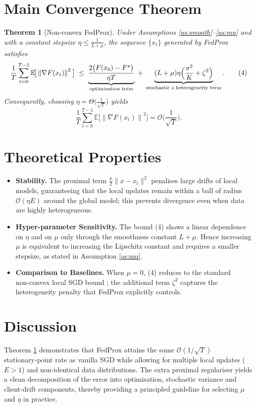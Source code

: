 \documentclass{article}
\newtheorem{theorem}{Theorem}
\newcommand{\EE}{\mathbb{E}}
\newcommand{\norm}[1]{\left\|#1\right\|}
\begin{document}
\section*{Main Convergence Theorem}
\begin{theorem}[Non‑convex FedProx]\label{thm:main}
Under Assumptions \ref{as:smooth}–\ref{as:mu} and with a constant stepsize
$\eta\le \frac{1}{L+\mu}$, the sequence $\{x_t\}$ generated by FedProx satisfies
\[
\frac1T\sum_{t=0}^{T-1}\EE\!\big[\norm{\nabla F(x_t)}^{2}\big]
\;\le\;
\underbrace{\frac{2\big(F(x_0)-F^{\star}\big)}{\eta T}}_{\text{optimization term}}
\;+\;
\underbrace{(L+\mu)\eta\Big(\frac{\sigma^{2}}{K}+ \zeta^{2}\Big)}_{\text{stochastic\,+\,heterogeneity term}}.
\tag{4}
\]
Consequently, choosing $\eta=\Theta\!\big(\frac{1}{\sqrt{T}}\big)$ yields
\[
\frac1T\sum_{t=0}^{T-1}\EE\!\big[\norm{\nabla F(x_t)}^{2}\big]=
\mathcal{O}\!\Big(\frac{1}{\sqrt{T}}\Big).
\]
\end{theorem}

\section*{Theoretical Properties}
\begin{itemize}
\item \textbf{Stability.} The proximal term $\frac{\mu}{2}\|x-x_t\|^{2}$ penalises
large drifts of local models, guaranteeing that the local updates remain
within a ball of radius $\mathcal{O}(\eta E)$ around the global model; this
prevents divergence even when data are highly heterogeneous.
\item \textbf{Hyper‑parameter Sensitivity.}
The bound (4) shows a linear dependence on $\eta$ and on $\mu$ only through
the smoothness constant $L+\mu$.  Hence increasing $\mu$ is equivalent to
increasing the Lipschitz constant and requires a smaller stepsize, as
stated in Assumption \ref{as:mu}.
\item \textbf{Comparison to Baselines.}
When $\mu=0$, (4) reduces to the standard non‑convex local SGD bound
\cite{stich2019local}; the additional term $\zeta^{2}$ captures the
heterogeneity penalty that FedProx explicitly controls.
\end{itemize}

\section*{Discussion}
Theorem \ref{thm:main} demonstrates that FedProx attains the same
$\mathcal{O}(1/\sqrt{T})$ stationary‑point rate as vanilla SGD while
allowing for multiple local updates ($E>1$) and non‑identical data
distributions.  The extra proximal regulariser yields a clean
decomposition of the error into optimisation, stochastic variance and
client‑drift components, thereby providing a principled guideline for
selecting $\mu$ and $\eta$ in practice.
\end{document}
